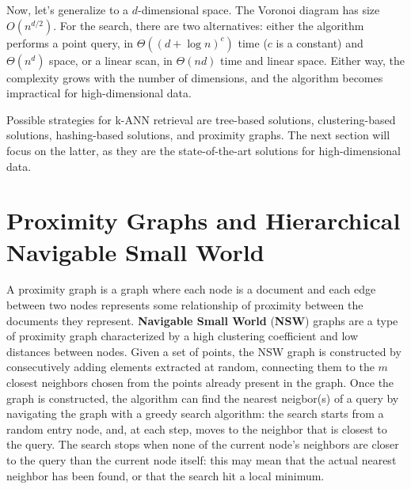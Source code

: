 Now, let's generalize to a $d$-dimensional space. The Voronoi diagram has size $O(n^{d/2})$. For the search, there are two alternatives: either the algorithm performs a point query, in $\Theta((d + \log n)^c)$ time ($c$ is a constant) and $\Theta(n^d)$ space, or a linear scan, in $\Theta(nd)$ time and linear space. Either way, the complexity grows with the number of dimensions, and the algorithm becomes impractical for high-dimensional data.

Possible strategies for k-ANN retrieval are tree-based solutions, clustering-based solutions, hashing-based solutions, and proximity graphs. The next section will focus on the latter, as they are the state-of-the-art solutions for high-dimensional data.

\section{Proximity Graphs and Hierarchical Navigable Small World}

A proximity graph is a graph where each node is a document and each edge between two nodes represents some relationship of proximity between the documents they represent. \textbf{Navigable Small World} (\textbf{NSW}) graphs are a type of proximity graph characterized by a high clustering coefficient and low distances between nodes. Given a set of points, the NSW graph is constructed by consecutively adding elements extracted at random, connecting them to the $m$ closest neighbors chosen from the points already present in the graph. Once the graph is constructed, the algorithm can find the nearest neigbor(s) of a query by navigating the graph with a greedy search algorithm: the search starts from a random entry node, and, at each step, moves to the neighbor that is closest to the query. The search stops when none of the current node's neighbors are closer to the query than the current node itself: this may mean that the actual nearest neighbor has been found, or that the search hit a local minimum.

